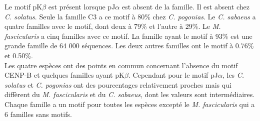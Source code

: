\documentclass[12pt,a4paper]{article}
\begin{document}
			Le motif pK$\beta$ est présent lorsque pJ$\alpha$ est absent de la famille. Il est absent chez \textit{C. solatus}. Seule la famille C3 a ce motif à 80\% chez \textit{C. pogonias}. Le \textit{C. sabaeus} a quatre familles avec le motif, dont deux à 79\% et l'autre à 29\%. Le \textit{M. fascicularis} a cinq familles avec ce motif. La famille ayant le motif à 93\% est une grande famille de 64 000 séquences. Les deux autres familles ont le motif à 0.76\% et 0.50\%.\\
			Les quatre espèces ont des points en commun concernant l'absence du motif CENP-B et quelques familles ayant pK$\beta$. Cependant pour le motif pJ$\alpha$, les \textit{C. solatus} et \textit{C. pogonias}
 ont des pourcentages relativement proches mais qui diffèrent du \textit{M. fascicularis} et du \textit{C. sabaeus}, dont les valeurs sont intermédiaires. Chaque famille a un motif pour toutes les espèces excepté le \textit{M. fascicularis} qui a 6 familles sans motifs.\\ 			
\end{document}
